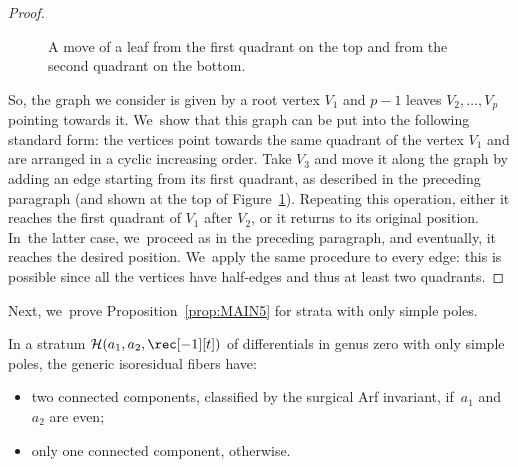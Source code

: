 \begin{proof}
\begin{figure}[ht]
\caption{A move of a leaf from the first quadrant on the top and from the second quadrant on the bottom.} \label{fig:operation2}
\end{figure}

So, the graph we consider is given by a root vertex $V_{1}$ and $p-1$ leaves $V_{2},\dots,V_{p}$ pointing towards it. We~show that this graph can be put into the following standard form: the vertices point towards the same quadrant of the vertex $V_{1}$ and are arranged in a cyclic increasing order. Take $V_{3}$ and move it along the graph by adding an edge starting from its first quadrant, as described in the preceding paragraph (and shown at the top of Figure~\ref{fig:operation2}). Repeating this operation, either it reaches the first quadrant of $V_{1}$ after $V_{2}$, or it returns to its original position. In~the latter case, we~proceed as in the preceding paragraph, and eventually, it reaches the desired position. We~apply the same procedure to every edge: this is possible since all the vertices have half-edges and thus at least two quadrants.
\end{proof}

Next, we~prove Proposition~\ref{prop:MAIN5} for strata with only simple poles.

\begin{lem}\label{lem:MAIN5Simple}
In a stratum $\mathcal{H}(a_{1},a_{2},\rec[-1][t])$ of differentials in genus zero with only simple poles, the generic isoresidual fibers have:
\begin{itemize}
\item two connected components, classified by the surgical Arf invariant, if~$a_{1}$ and $a_{2}$ are even;
\item only one connected component, otherwise.
\end{itemize}
\end{lem}

